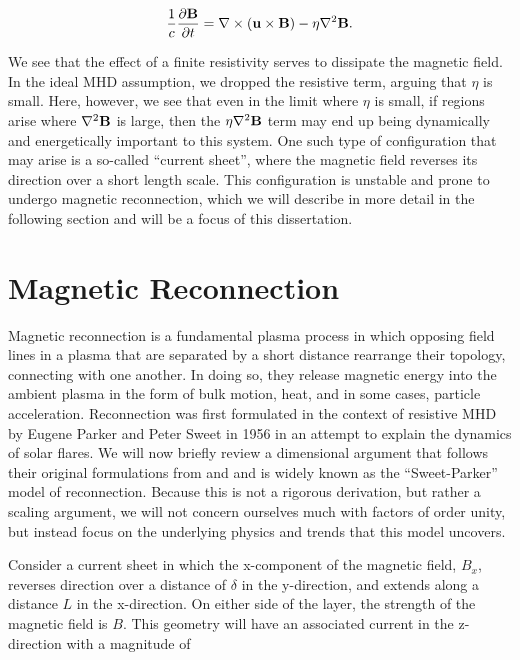 \begin{equation}
		\frac{1}{c}\frac{\partial \bold{B}}{\partial t} =\nabla \times (\bold{u}\times\bold{B}) -\eta \nabla^2 \bold{B}.
\end{equation}

We see that the effect of a finite resistivity serves to dissipate the magnetic field.  In the ideal MHD assumption, we dropped the resistive term, arguing that $\eta$ is small.  Here, however, we see that even in the limit where $\eta$ is small, if regions arise where $\nabla^2 \bold{B}$ is large, then the $\eta \nabla^2 \bold{B}$ term may end up being dynamically and energetically important to this system.  One such type of configuration that may arise is a so-called ``current sheet'', where the magnetic field reverses its direction over a short length scale.  This configuration is unstable and prone to undergo magnetic reconnection, which we will describe in more detail in the following section and will be a focus of this dissertation.

\section{Magnetic Reconnection}
Magnetic reconnection is a fundamental plasma process in which opposing field lines in a plasma that are separated by a short distance rearrange their topology, connecting with one another.  In doing so, they release magnetic energy into the ambient plasma in the form of bulk motion, heat, and in some cases, particle acceleration.  Reconnection was first formulated in the context of resistive MHD by Eugene Parker and Peter Sweet in 1956 in an attempt to explain the dynamics of solar flares.  We will now briefly review a dimensional argument that follows their original formulations from \citet{parker1957} and \cite{sweet1958} and is widely known as the ``Sweet-Parker'' model of reconnection.  Because this is not a rigorous derivation, but rather a scaling argument, we will not concern ourselves much with factors of order unity, but instead focus on the underlying physics and trends that this model uncovers.

Consider a current sheet in which the x-component of the magnetic field, $B_x$, reverses direction over a distance of $\delta$ in the y-direction, and extends along a distance $L$ in the x-direction.  On either side of the layer, the strength of the magnetic field is $B$.  This geometry will have an associated current in the z-direction with a magnitude of 

